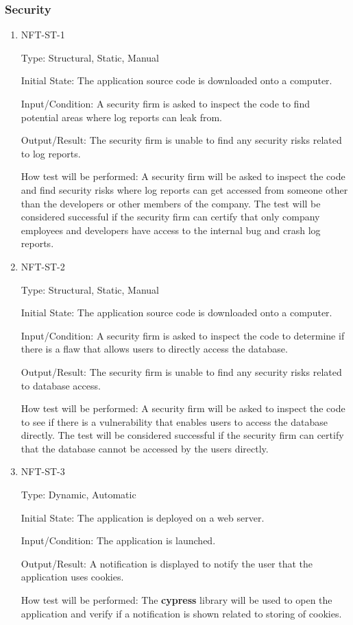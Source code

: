 \documentclass[12pt, titlepage]{article}
\begin{document}
\subsubsection{Security}
\begin{enumerate}
\item{NFT-ST-1}

Type: Structural, Static, Manual
					
Initial State: The application source code is downloaded onto a computer.
					
Input/Condition: A security firm is asked to inspect the code to find potential areas where log reports can leak from.
					
Output/Result: The security firm is unable to find any security risks related to log reports.
					
How test will be performed: A security firm will be asked to inspect the code and find security risks where log reports can get accessed from someone other than the developers or other members of the company. The test will be considered successful if the security firm can certify that only company employees and developers have access to the internal bug and crash log reports.

\item{NFT-ST-2}

Type: Structural, Static, Manual
					
Initial State: The application source code is downloaded onto a computer.
					
Input/Condition: A security firm is asked to inspect the code to determine if there is a flaw that allows users to directly access the database.
					
Output/Result: The security firm is unable to find any security risks related to database access.
					
How test will be performed: A security firm will be asked to inspect the code to see if there is a vulnerability that enables users to access the database directly. The test will be considered successful if the security firm can certify that the database cannot be accessed by the users directly.

\item{NFT-ST-3}

Type: Dynamic, Automatic
					
Initial State: The application is deployed on a web server.
					
Input/Condition: The application is launched.
					
Output/Result: A notification is displayed to notify the user that the application uses cookies.
					
How test will be performed: The \textbf{cypress} library will be used to open the application and verify if a notification is shown related to storing of cookies.
\end{enumerate}
\end{document}
